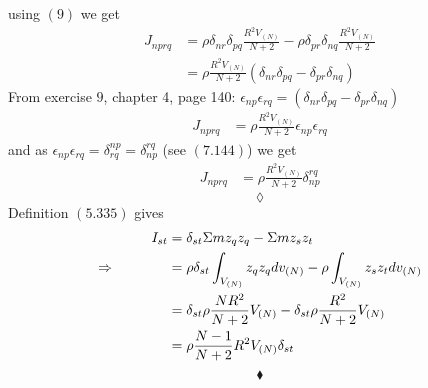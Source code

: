 using $(9)$ we get
\begin{align}
J_{nprq} &= \rho\delta_{nr}\delta_{pq}\frac{R^2V_{(N)}}{N+2}-\rho\delta_{pr}\delta_{nq}\frac{R^2V_{(N)}}{N+2}\\
&= \rho\frac{R^2V_{(N)}}{N+2}\left(\delta_{nr}\delta_{pq}- \delta_{pr}\delta_{nq}\right)
\end{align}
From exercise $9$, chapter 4, page 140: $\epsilon_{np}\epsilon_{rq} = \left(\delta_{nr}\delta_{pq}- \delta_{pr}\delta_{nq}\right)$
\begin{align}
J_{nprq} &=\rho\frac{R^2V_{(N)}}{N+2}\epsilon_{np}\epsilon_{rq}
\end{align}
and as $\epsilon_{np}\epsilon_{rq} = \delta_{rq}^{np} =  \delta^{rq}_{np}$ (see $\mathbf{(7.144)}$) we get 
\begin{align}
J_{nprq} &=\rho\frac{R^2V_{(N)}}{N+2} \delta^{rq}_{np}
\end{align}
$$\lozenge$$
Definition $\mathbf{(5.335)}$ gives
\begin{align}
I_{st} &= \delta_{st}\Sigma m z_q z_q -\Sigma m z_s z_t \\
\Rightarrow \quad\quad\quad\quad &=  \rho \delta_{st}\int_{V_{(N)}}  z_q z_q dv_{(N)} -\rho \int_{V_{(N)}} z_s z_t dv_{(N)}\\
&=  \delta_{st}\rho\frac{N R^2 }{N+2}V_{(N)}  - \delta_{st}\rho \frac{R^2}{N+2} V_{(N)}\\
&=  \rho\frac{N-1 }{N+2}R^2 V_{(N)}\delta_{st} 
\end{align}
$$\blacklozenge$$
\newpage

